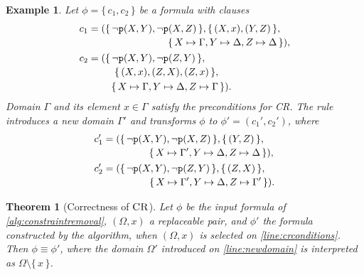 \documentclass{article}
\newtheorem{theorem}{Theorem}
\newtheorem{example}{Example}
\newcommand{\predicate}{\texttt{\textup{p}}}
\DeclareMathOperator{\CR}{\textsc{CR}}
\begin{document}
\begin{example}
  Let $\phi = \{\, c_1, c_2 \,\}$ be a formula with clauses
  \begin{align*}
    c_1 &=
          \begin{multlined}[t]
            (\{\, \neg \predicate(X, Y), \neg \predicate(X, Z) \,\}, \{\, (X, x), (Y, Z) \,\}, \\
            \{\, X \mapsto \Gamma, Y \mapsto \Delta, Z \mapsto \Delta \,\}),
          \end{multlined}\\
    c_2 &=
          \begin{multlined}[t]
            (\{\, \neg \predicate(X, Y), \neg \predicate(Z, Y) \,\}, \\
            \{\, (X, x), (Z, X), (Z, x) \,\}, \\
            \{\, X \mapsto \Gamma, Y \mapsto \Delta, Z \mapsto \Gamma \,\}).
          \end{multlined}
  \end{align*}
  Domain $\Gamma$ and its element $x \in \Gamma$ satisfy the preconditions for
  CR\@. The rule introduces a new domain $\Gamma'$ and transforms $\phi$ to
  $\phi' = (c_1', c_2')$, where
  \begin{align*}
    c_1' &=
           \begin{multlined}[t]
             (\{\, \neg \predicate(X, Y), \neg \predicate(X, Z) \,\}, \{\, (Y, Z) \,\}, \\
             \{\, X \mapsto \Gamma', Y \mapsto \Delta, Z \mapsto \Delta \,\}),
           \end{multlined} \\
    c_2' &=
           \begin{multlined}[t]
             (\{\, \neg \predicate(X, Y), \neg \predicate(Z, Y) \,\}, \{\, (Z, X) \,\}, \\
             \{\, X \mapsto \Gamma', Y \mapsto \Delta, Z \mapsto \Gamma' \,\}).
           \end{multlined}
  \end{align*}
\end{example}

\begin{theorem}[Correctness of $\CR$]
  Let $\phi$ be the input formula of \cref{alg:constraintremoval}, $(\Omega, x)$
  a replaceable pair, and $\phi'$ the formula constructed by the algorithm, when
  $(\Omega, x)$ is selected on \cref{line:crconditions}. Then
  $\phi \equiv \phi'$, where the domain $\Omega'$ introduced on
  \cref{line:newdomain} is interpreted as $\Omega \setminus \{\, x \,\}$.
\end{theorem}
\end{document}
